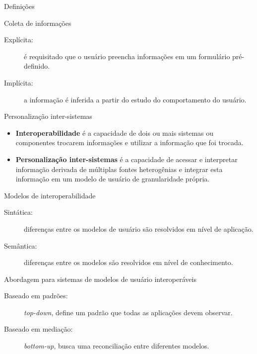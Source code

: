 \documentclass{beamer}
\begin{document}
\begin{frame}[allowframebreaks]{Definições}
  \begin{block}{Coleta de informações}
    \begin{description}
      \item[Explícita:] é requisitado que o usuário preencha informações em um formulário pré-definido.
      \item[Implícita:] a informação é inferida a partir do estudo do comportamento do usuário.
    \end{description}
  \end{block}

  \begin{block}{Personalização inter-sistemas}
    \begin{itemize} 
      \item \textbf{Interoperabilidade} é a capacidade de dois ou mais sistemas ou componentes trocarem informações e utilizar a informação que foi trocada. \cite{ieeedict}
      \item \textbf{Personalização inter-sistemas} é a capacidade de acessar e interpretar informação derivada de múltiplas fontes heterogênias e integrar esta informação em um modelo de usuário de granularidade própria. \cite{carmagnola09}
    \end{itemize}
  \end{block}

  \begin{block}{Modelos de interoperabilidade}
    \begin{description}
      \item[Sintática:] diferenças entre os modelos de usuário são resolvidos em nível de aplicação.
      \item[Semântica:] diferenças entre os modelos são resolvidos em nível de conhecimento.
    \end{description}
  \end{block}

  \begin{block}{Abordagem para sistemas de modelos de usuário interoperáveis}
    \begin{description}
      \item[Baseado em padrões:] \emph{top-down}, define um padrão que todas as aplicações devem observar.
      \item[Baseado em mediação:] \emph{bottom-up}, busca uma reconciliação entre diferentes modelos.
    \end{description}
  \end{block}

\end{frame}
\end{document}
